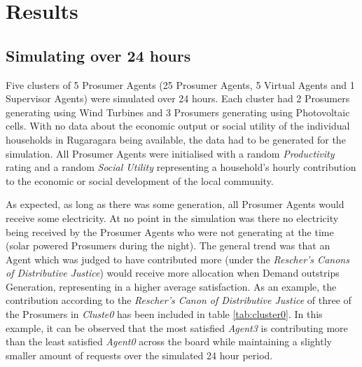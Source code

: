 \chapter{Results}
\label{Results}

\section*{Simulating over 24 hours}
Five clusters of 5 Prosumer Agents (25 Prosumer Agents, 5 Virtual Agents and 1 Supervisor Agents) were simulated over 24 hours. Each cluster had 2 Prosumers generating using Wind Turbines and 3 Prosumers generating using Photovoltaic cells. With no data about the economic output or social utility of the individual households in Rugaragara being available, the data had to be generated for the simulation. All Prosumer Agents were initialised with a random \textit{Productivity} rating and a random \textit{Social Utility} representing a household's hourly contribution to the economic or social development of the local community.

As expected, as long as there was some generation, all Prosumer Agents would receive some electricity. At no point in the simulation was there no electricity being received by the Prosumer Agents who were not generating at the time (solar powered Prosumers during the night). The general trend was that an Agent which was judged to have contributed more (under the \textit{Rescher's Canons of Distributive Justice}) would receive more allocation when Demand outstrips Generation, representing in a higher average satisfaction. As an example, the contribution according to the \textit{Rescher's Canon of Distributive Justice} of three of the Prosumers in \textit{Cluste0} has been included in table \ref{tab:cluster0}. In this example, it can be observed that the most satisfied \textit{Agent3} is contributing more than the least satisfied \textit{Agent0} across the board while maintaining a slightly smaller amount of requests over the simulated 24 hour period. 

